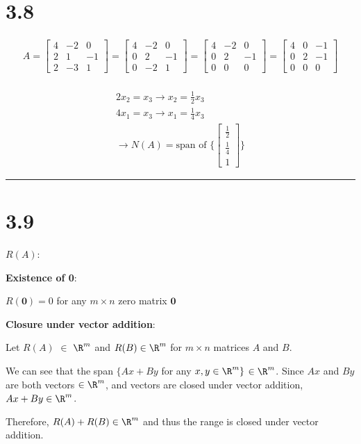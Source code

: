 \documentclass[
  12pt,
]{article}
\begin{document}
\chapter{3.8}\label{section-3}

\[
\begin{aligned}
A = \begin{bmatrix}
4 & -2 & 0 \\
2 & 1 & -1 \\
2 & -3 & 1
\end{bmatrix} = \begin{bmatrix}
4 & -2 & 0 \\
0 & 2 & -1 \\
0 & -2 & 1
\end{bmatrix} = \begin{bmatrix}
4 & -2 & 0 \\
0 & 2 & -1 \\
0 & 0 & 0
\end{bmatrix} = \begin{bmatrix}
4 & 0 & -1 \\
0 & 2 & -1 \\
0 & 0 & 0
\end{bmatrix}  \\
\end{aligned}
\]

\[
\begin{aligned}
2x_2 = x_3 \rightarrow x_2 = \frac{1}{2} x_3\\
4x_1 = x_3\rightarrow x_1 = \frac{1}{4}x_3 \\
\rightarrow N(A) = \text{span of } \Biggl\{ \begin{bmatrix} \frac{1}{2} \\ \frac{1}{4} \\ 1 \end{bmatrix} \Biggl\}
\end{aligned}
\]

\begin{center}\rule{0.5\linewidth}{0.5pt}\end{center}

\chapter{3.9}\label{section-4}

\(R(A)\):

\textbf{Existence of 0}:

\(R(\mathbf{0}) = 0\) for any \(m\times n\) zero matrix \(\mathbf{0}\)

\textbf{Closure under vector addition}:

Let \(R(A)\) \(\in\) \(\R^m\) and \(R(B) \in \R^m\) for \(m \times n\) matrices \(A\) and \(B\).

We can see that the span \(\{Ax + By\) for any \(x, y \in \R^m\}\) \(\in \R^m\). Since \(Ax\) and \(By\) are both vectors \(\in \R^m\), and vectors are closed under vector addition, \(Ax + By \in \R^m\).

Therefore, \(R(A) + R(B) \in \R^m\) and thus the range is closed under vector addition.
\end{document}
